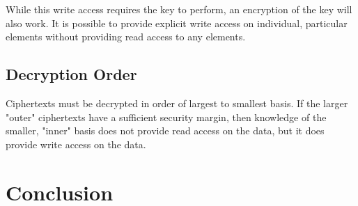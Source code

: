 \documentclass[preprint]{iacrtrans}
\begin{document}
While this write access requires the key to perform, an encryption of the key will also work. It is possible to provide explicit write access on individual, particular elements without providing read access to any elements.

\subsection{Decryption Order}
Ciphertexts must be decrypted in order of largest to smallest basis. If the larger "outer" ciphertexts have a sufficient security margin, then knowledge of the smaller, "inner" basis does not provide read access on the data, but it does provide write access on the data.

\section{Conclusion}
\end{document}
